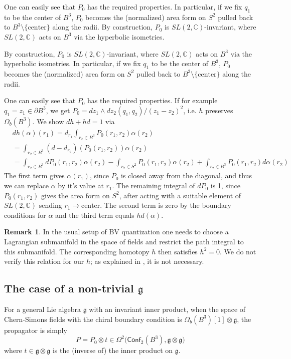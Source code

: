 \documentclass[a4paper]{amsart}
\theoremstyle{plain}
\theoremstyle{definition}
\newtheorem*{rem}{Remark}
\newcommand{\g}{\mathfrak{g}}
\newcommand{\C}{\mathbb{C}}
\newcommand{\cf}{\mathsf{Conf}}
\begin{document}
{\color{gray}
One can easily see that $P_0$ has the required properties. In particular, if we fix $q_1$  to be the center of $B^3$, $P_0$ becomes  the (normalized) area form on $S^2$ pulled back to $B^3\setminus\{\text{center}\}$ along the radii. By construction, $P_0$ is $SL(2,\C)$-invariant, where $SL(2,\C)$ acts on $B^3$ via the hyperbolic isometries.
}
{\color{teal}
By construction, $P_0$ is $SL(2,\C)$-invariant, where $SL(2,\C)$ acts on $B^3$ via the hyperbolic isometries. 
 In particular, if we fix $q_1$  to be the center of $B^3$, $P_0$ becomes  the (normalized) area form on $S^2$ pulled back to $B^3\setminus\{\text{center}\}$ along the radii. 

One can easily see that $P_0$ has the required properties.
If for example $q_{1}=z_{1}\in \partial B^{3}$, we get $P_{0} = d z_{1} \wedge d z_{2}(q_{1}, q_{2}) /(z_{1}- z_{2})^{2}$, i.e. $h$ preserves $\Omega_{b}(B^{3})$. We show $dh + hd = 1$ via
\begin{align*}
&dh(\alpha) (r_{1}) = d_{r_{1}} \int_{r_{2}\in B^{3}}P_{0}(r_{1}, r_{2}) \alpha(r_{2}) 
\\&= \int_{r_{2}\in B^{3}} (d - d_{r_{2}})(P_{0}(r_{1}, r_{2})) \alpha(r_{2})
\\&= 
 \int_{r_{2}\in B^{3}} dP_{0}(r_{1}, r_{2}) \alpha(r_{2}) 
 -\int_{r_{2}\in S^{2}} P_{0}(r_{1}, r_{2}) \alpha(r_{2}) 
 +\int_{r_{2}\in B^{3}} P_{0}(r_{1}, r_{2}) d\alpha(r_{2})
\end{align*}
The first term gives $\alpha(r_{1})$, since
$P_{0}$ is closed away from the diagonal, and thus we can replace $\alpha$ by it's value
at $r_{1}$. 
The remaining integral of $dP_{0}$ is 1, since $P_{0}(r_{1}, r_{2})$ gives the area form on $S^{2}$, after acting with a suitable element of $SL(2, \mathbb C)$ sending $r_{1} \mapsto \text{center}$. The second term is zero by the boundary conditions for $\alpha$ and the third term equals $hd(\alpha)$. 
}

\begin{rem}
In the usual setup of BV quantization one needs to choose a Lagrangian submanifold in the space of fields and restrict the path integral to this submanifold. The corresponding homotopy $h$ then satisfies $h^2=0$. We do not verify this relation for our $h$; as explained in \cite{CM}, it is not necessary.
\end{rem}

\subsection{The case of a non-trivial $\g$}
For a general Lie algebra $\g$ with an invariant inner product, when the space of Chern-Simons fields with the chiral boundary condition is $\Omega_b(B^3)[1]\otimes\g$, the propagator is simply
$$P=P_0\otimes t\in \Omega^2\bigl(\cf_2(B^3),\g\otimes\g\bigr)$$
where $t\in\g\otimes\g$ is the (inverse of) the inner product on $\g$. 
\end{document}
